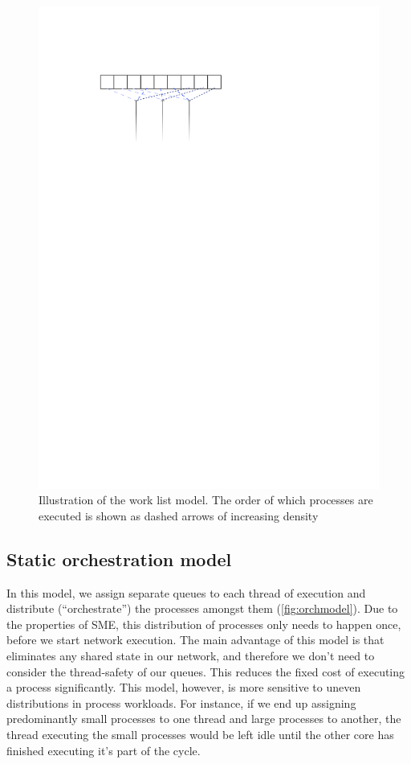 \begin{figure}
\centering
\includegraphics{figures/roundrobin}
\caption[Work list model]{Illustration of the work list model. The
  order of which processes are executed is shown as dashed arrows of
  increasing density}
\label{fig:worklist}
\end{figure}



\subsection{Static orchestration model}
In this model, we assign separate queues to each thread of execution
and distribute (``orchestrate'') the processes amongst them
(\cref{fig:orchmodel}). Due to the properties of SME, this distribution
of processes only needs to happen once, before we start network
execution. The main advantage of this model is that eliminates any
shared state in our network, and therefore we don't need to consider
the thread-safety of our queues. This reduces the fixed cost of
executing a process significantly. This model, however, is more
sensitive to uneven distributions in process workloads. For instance,
if we end up assigning predominantly small processes to one thread and
large processes to another, the thread executing the small processes
would be left idle until the other core has finished executing it's
part of the cycle.

